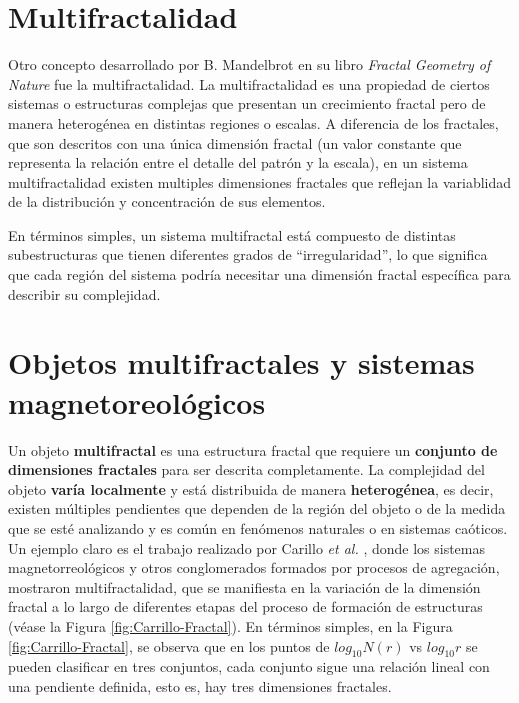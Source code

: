 \section{Multifractalidad}

Otro concepto desarrollado por B. Mandelbrot en su libro \textit{Fractal Geometry of Nature} fue la multifractalidad. La multifractalidad es una propiedad de ciertos sistemas o estructuras complejas que presentan un crecimiento fractal pero de manera heterog\'{e}nea en distintas regiones o escalas. A diferencia de los fractales, que son descritos con una \'{u}nica dimensi\'{o}n fractal (un valor constante que representa la relaci\'{o}n entre el detalle del patr\'{o}n y la escala), en un sistema multifractalidad existen multiples dimensiones fractales que reflejan la variablidad de la distribuci\'{o}n y concentraci\'{o}n de sus elementos. 

En t\'{e}rminos simples, un sistema multifractal est\'{a} compuesto de distintas subestructuras que tienen diferentes grados de ``irregularidad'', lo que significa que cada regi\'{o}n del sistema podr\'{i}a necesitar una dimensi\'{o}n fractal espec\'{i}fica para describir su complejidad.

\section*{Objetos multifractales y sistemas magnetoreol\'{o}gicos}

Un objeto \textbf{multifractal} es una estructura fractal que requiere un \textbf{conjunto de dimensiones fractales} para ser descrita completamente. La complejidad del objeto \textbf{var\'{i}a localmente} y est\'{a} distribuida de manera \textbf{heterog\'{e}nea}, es decir, existen m\'{u}ltiples pendientes que dependen de la regi\'{o}n del objeto o de la medida que se est\'{e} analizando y es com\'{u}n en fen\'{o}menos naturales o en sistemas ca\'{o}ticos. Un ejemplo claro es el trabajo realizado por Carillo \textit{et al.} \cite{Carrillo2003}, donde los sistemas 
magnetorreol\'{o}gicos y otros conglomerados formados por procesos de agregaci\'{o}n, mostraron multifractalidad, que se manifiesta en la variaci\'{o}n de la dimensi\'{o}n fractal a lo largo de diferentes etapas del proceso de formaci\'{o}n 
de estructuras (v\'{e}ase la Figura \ref{fig:Carrillo-Fractal}). En t\'{e}rminos simples, en la Figura \ref{fig:Carrillo-Fractal}, se observa que en los puntos de $log_{10}N(r)$ vs $log_{10}r$ se pueden clasificar en tres conjuntos, cada conjunto sigue una relaci\'{o}n lineal con una pendiente definida, esto es, hay tres dimensiones fractales.


